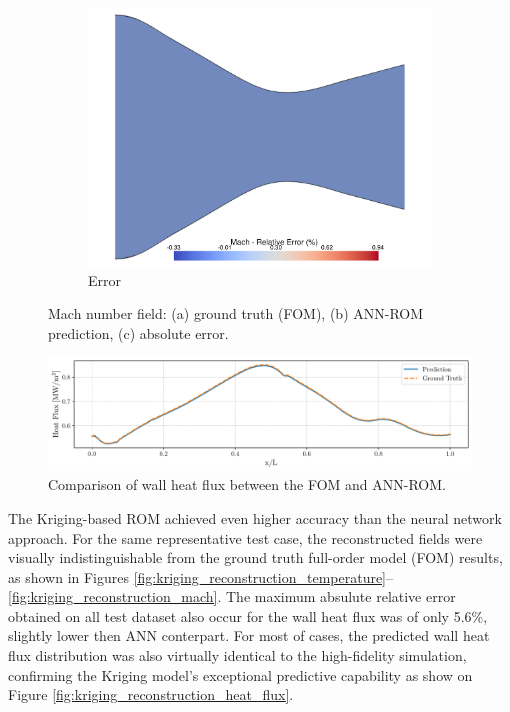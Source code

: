 \documentclass[tg, EN]{ufabcFHZh_tg}
\begin{document}
\begin{figure}[H]
\begin{subfigure}[b]{0.32\textwidth}
        \includegraphics[width=\textwidth]{Figuras/nn_error_mach.pdf}
        \caption{Error}
    \end{subfigure}
    \caption{Mach number field: (a) ground truth (FOM), (b) ANN-ROM prediction, (c) absolute error.}
    \label{fig:nn_reconstruction_mach}
\end{figure}

\begin{figure}[H]
    \centering
    \includegraphics[width=\textwidth]{Figuras/nn_heat_flux.pdf}
    \caption{Comparison of wall heat flux between the FOM and ANN-ROM.}
    \label{fig:nn_reconstruction_heat_flux}
\end{figure}

The Kriging-based ROM achieved even higher accuracy than the neural network approach. For the same representative test case, the reconstructed fields were visually indistinguishable from the ground truth full-order model (FOM) results, as shown in Figures \ref{fig:kriging_reconstruction_temperature}--\ref{fig:kriging_reconstruction_mach}. The maximum absulute relative error obtained on all test dataset also occur for the wall heat flux was of only 5.6\%, slightly lower then ANN conterpart. For most of cases, the predicted wall heat flux distribution was also virtually identical to the high-fidelity simulation, confirming the Kriging model's exceptional predictive capability as show on Figure \ref{fig:kriging_reconstruction_heat_flux}.
\end{document}
